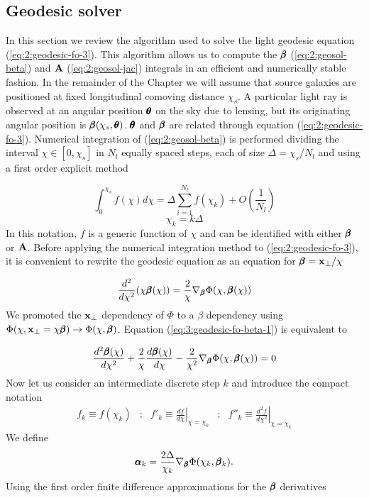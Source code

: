 \subsection{Geodesic solver}
In this section we review the algorithm used to solve the light geodesic equation (\ref{eq:2:geodesic-fo-3}). This algorithm allows us to compute the $\pmb{\beta}$ (\ref{eq:2:geosol-beta}) and $\mathbf{A}$ (\ref{eq:2:geosol-jac}) integrals in an efficient and numerically stable fashion. In the remainder of the Chapter we will assume that source galaxies are positioned at fixed longitudinal comoving distance $\chi_s$. A particular light ray is observed at an angular position $\pmb{\theta}$ on the sky due to lensing, but its originating angular position is $\pmb{\beta}(\chi_s,\pmb{\theta})$. $\pmb{\theta}$ and $\pmb{\beta}$ are related through equation (\ref{eq:2:geodesic-fo-3}). Numerical integration of (\ref{eq:2:geosol-beta}) is performed dividing the interval $\chi\in[0,\chi_s]$ in $N_l$ equally spaced steps, each of size $\Delta = \chi_s/N_l$ and using a first order explicit method

\begin{equation}
\label{eq:3:int-fo}
\int_0^{\chi_s} f(\chi)d\chi = \Delta\sum_{i=1}^{N_l}f(\chi_k) + O\left(\frac{1}{N_l}\right)
\end{equation} 
%
\begin{equation}
\label{eq:3:int-steps}
\chi_k = k\Delta
\end{equation}  
%
In this notation, $f$ is a generic function of $\chi$ and can be identified with either $\pmb{\beta}$ or $\mathbf{A}$. Before applying the numerical integration method to (\ref{eq:2:geodesic-fo-3}), it is convenient to rewrite the geodesic equation as an equation for $\pmb{\beta}=\mathbf{x}_\perp/\chi$ 

\begin{equation}
\label{eq:3:geodesic-fo-beta-1}
\frac{d^2}{d\chi^2}(\chi\pmb{\beta}(\chi)) = \frac{2}{\chi}\nabla_{\pmb{\beta}}\Phi(\chi,\pmb{\beta}(\chi))
\end{equation} 
%
We promoted the $\mathbf{x}_\perp$ dependency of $\Phi$ to a $\beta$ dependency using $\Phi(\chi,\mathbf{x}_\perp=\chi\pmb{\beta})\rightarrow\Phi(\chi,\pmb{\beta})$. Equation (\ref{eq:3:geodesic-fo-beta-1}) is equivalent to 

\begin{equation}
\label{eq:3:geodesic-fo-beta-2}
\frac{d^2\pmb{\beta}(\chi)}{d\chi^2} + \frac{2}{\chi}\frac{d\pmb{\beta}(\chi)}{d\chi} - \frac{2}{\chi^2}\nabla_{\pmb{\beta}}\Phi(\chi,\pmb{\beta}(\chi)) = 0
\end{equation}
%
Now let us consider an intermediate discrete step $k$ and introduce the compact notation 
\begin{equation}
\label{eq:3:compactnotation}
\begin{matrix}
f_k\equiv f(\chi_k) & ; & f'_k\equiv\left.\frac{df}{d\chi}\right\vert_{\chi=\chi_k} & ; & f''_k\equiv\left.\frac{d^2f}{d\chi^2}\right\vert_{\chi=\chi_k}
\end{matrix}
\end{equation}  
%
We define
\begin{equation}
\label{eq:3:alphak}
\pmb{\alpha}_k = \frac{2\Delta}{\chi_k}\nabla_{\pmb{\beta}}\Phi(\chi_k,\pmb{\beta}_k).
\end{equation}
%
Using the first order finite difference approximations for the $\pmb{\beta}$ derivatives

